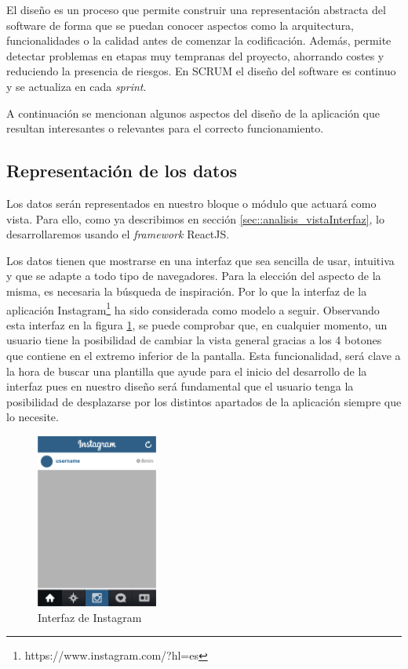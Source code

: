 El diseño es un proceso que permite construir una representación abstracta del software de forma que se puedan conocer aspectos como la arquitectura, funcionalidades o la calidad antes de comenzar la codificación. Además, permite detectar problemas en etapas muy tempranas del proyecto, ahorrando costes y reduciendo la presencia de riesgos. En SCRUM el diseño del software es continuo y se actualiza en cada \textit{sprint}.

A continuación se mencionan algunos aspectos del diseño de la aplicación que resultan interesantes o relevantes para el correcto funcionamiento.

\subsection{Representación de los datos}

Los datos serán representados en nuestro bloque o módulo que actuará como vista. Para ello, como ya describimos en sección \ref{sec::analisis_vistaInterfaz}, lo desarrollaremos usando el \textit{framework} ReactJS.

Los datos tienen que mostrarse en una interfaz que sea sencilla de usar, intuitiva y que se adapte a todo tipo de navegadores. Para la elección del aspecto de la misma, es necesaria la búsqueda de inspiración. Por lo que la interfaz de la aplicación Instagram\footnote{https://www.instagram.com/?hl=es} ha sido considerada como modelo a seguir. Observando esta interfaz en la figura \ref{fig::insta}, se puede comprobar que, en cualquier momento, un usuario tiene la posibilidad de cambiar la vista general gracias a los 4 botones que contiene en el extremo inferior de la pantalla. Esta funcionalidad, será clave a la hora de buscar una plantilla que ayude para el inicio del desarrollo de la interfaz pues en nuestro diseño será fundamental que el usuario tenga la posibilidad de desplazarse por los distintos apartados de la aplicación siempre que lo necesite.

\begin{figure}[htbp]
    \centerline{\includegraphics[width=4cm]{figuras/insta.jpg}}
    \caption{Interfaz de Instagram}
    \label{fig::insta}
\end{figure}


